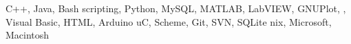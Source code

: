 
\citembullet C++, Java, Bash scripting,  Python, MySQL, MATLAB, LabVIEW, GNUPlot, \LaTeXe, Visual Basic, HTML, Arduino uC, Scheme, Git, SVN, SQLite
\citembullet *nix, Microsoft, Macintosh

